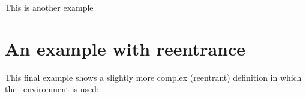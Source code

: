 \documentclass[a4paper]{article}
\begin{document}
This is another example
%
%


\section{An example with reentrance}
This final example shows a slightly more complex (reentrant)
definition in 
which the ~environment is used:
%
%
\end{document}
